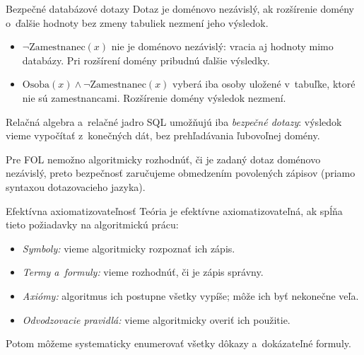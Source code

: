 \documentclass[12pt]{beamer}
\begin{document}
\begin{frame}{Bezpečné databázové dotazy}
  Dotaz je \alert{doménovo nezávislý}, ak rozšírenie domény
  o~ďalšie hodnoty bez zmeny tabuliek nezmení jeho výsledok.

  \begin{itemize}
    \item $\lnot\mathrm{Zamestnanec}(x)$ nie je doménovo nezávislý:
      vracia aj hodnoty mimo databázy. Pri rozšírení domény pribudnú
      ďalšie výsledky.
    \item $\mathrm{Osoba}(x)\land\lnot\mathrm{Zamestnanec}(x)$
      vyberá iba osoby uložené v~tabuľke, ktoré nie sú zamestnancami.
      Rozšírenie domény výsledok nezmení.
  \end{itemize}

  Relačná algebra a~relačné jadro SQL umožňujú iba
  \emph{bezpečné dotazy}: výsledok vieme vypočítať z~konečných dát,
  bez prehľadávania ľubovoľnej domény.

  \alert{Pre FOL nemožno algoritmicky rozhodnúť, či je zadaný dotaz
  doménovo nezávislý}, preto bezpečnosť zaručujeme obmedzením
  povolených zápisov (priamo syntaxou dotazovacieho jazyka).
\end{frame}

\begin{frame}{Efektívna axiomatizovateľnosť}
  Teória je \alert{efektívne axiomatizovateľná}, ak spĺňa tieto
  požiadavky na algoritmickú prácu:
  \begin{itemize}
    \item \emph{Symboly:} vieme algoritmicky rozpoznať ich zápis.
    \item \emph{Termy a~formuly:} vieme rozhodnúť, či je zápis správny.
    \item \emph{Axiómy:} algoritmus ich postupne všetky vypíše;
      môže ich byť nekonečne veľa.
    \item \emph{Odvodzovacie pravidlá:} vieme algoritmicky overiť
      ich použitie.
  \end{itemize}
  Potom môžeme systematicky enumerovať všetky dôkazy
  a~dokázateľné formuly.
\end{frame}
\end{document}
